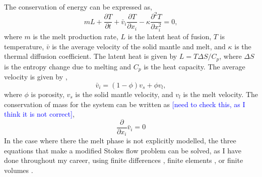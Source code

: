 The conservation of energy can be expressed as,
\begin{equation}
mL + \frac{\partial T}{\partial t} + \bar{v}_{i}\frac{\partial T}{\partial x_{i}} - \kappa\frac{\partial^{2}T}{\partial x_{i}^{2}} = 0,
\label{eq:energy}
\end{equation}
where $m$ is the melt production rate, $L$ is the latent heat of fusion, $T$ is temperature, $\bar{v}$ is the average velocity of the solid mantle and melt, and $\kappa$ is the thermal diffusion coefficient. The latent heat is given by $L = T\Delta S/C_{p}$, where $\Delta S$ is the entropy change due to melting and $C_{p}$ is the heat capacity. The average velocity is given by \citep{scott-1992},
\begin{equation}
\bar{v}_{i} = \left(1-\phi\right)v_{s} + \phi v_{l},
\label{eq:average-velocity}
\end{equation}
where $\phi$ is porosity, $v_{s}$ is the solid mantle velocity, and $v_{l}$ is the melt velocity. The conservation of mass for the system can be written as \textcolor{blue}{[need to check this, as I think it is not correct]},
\begin{equation}
\frac{\partial}{\partial x_{i}}\bar{v}_{i} = 0
\label{eq:mass}
\end{equation}
In the case where there the melt phase is not explicitly modelled, the three equations that make a modified Stokes flow problem can be solved, as I have done throughout my career, using finite differences \citep[e.g.][]{armitage-etal-g3-2018}, finite elements \citep[e.g.][]{armitage-etal-2008}, or finite volumes \citep[e.g.][]{civiero-etal-2019}.

